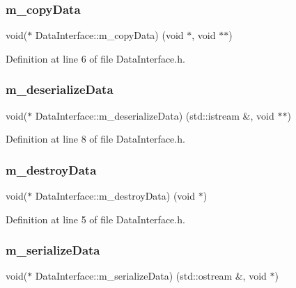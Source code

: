 \subsubsection{\texorpdfstring{m\+\_\+copy\+Data}{m\_copyData}}
{\footnotesize\ttfamily void($\ast$ Data\+Interface\+::m\+\_\+copy\+Data) (void $\ast$, void $\ast$$\ast$)}



Definition at line 6 of file Data\+Interface.\+h.

\mbox{\label{struct_data_interface_a53674c91ee0983fb20429291631d88f0}} 
\subsubsection{\texorpdfstring{m\+\_\+deserialize\+Data}{m\_deserializeData}}
{\footnotesize\ttfamily void($\ast$ Data\+Interface\+::m\+\_\+deserialize\+Data) (std\+::istream \&, void $\ast$$\ast$)}



Definition at line 8 of file Data\+Interface.\+h.

\mbox{\label{struct_data_interface_af6e607324293e0206fda4acbdfafe043}} 
\subsubsection{\texorpdfstring{m\+\_\+destroy\+Data}{m\_destroyData}}
{\footnotesize\ttfamily void($\ast$ Data\+Interface\+::m\+\_\+destroy\+Data) (void $\ast$)}



Definition at line 5 of file Data\+Interface.\+h.

\mbox{\label{struct_data_interface_a111a5b62fe0a45d937795853c8337d06}} 
\subsubsection{\texorpdfstring{m\+\_\+serialize\+Data}{m\_serializeData}}
{\footnotesize\ttfamily void($\ast$ Data\+Interface\+::m\+\_\+serialize\+Data) (std\+::ostream \&, void $\ast$)}




